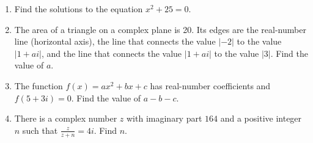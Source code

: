\documentclass[12pt]{extarticle}
\begin{document}
\begin{enumerate}
{\begin{enumerate}
        \end{enumerate}
    }
    \item {Find the solutions to the equation $x^2 + 25 = 0$.} %
    \item {The area of a triangle on a complex plane is 20. Its edges are the real-number line (horizontal axis), the line that connects the value $|-2|$ to the value $|1+ai|$, and the line that connects the value $|1+ai|$ to the value $|3|$. Find the value of $a$.} %
    \item {The function $f(x) = ax^2+bx+c$ has real-number coefficients and $f(5+3i) = 0$. Find the value of $a-b-c$.} %
    \item {There is a complex number $z$ with imaginary part $164$ and a positive integer $n$ such that $\frac{z}{z + n} = 4i$. Find $n$.} %
\end{enumerate}
\end{document}
